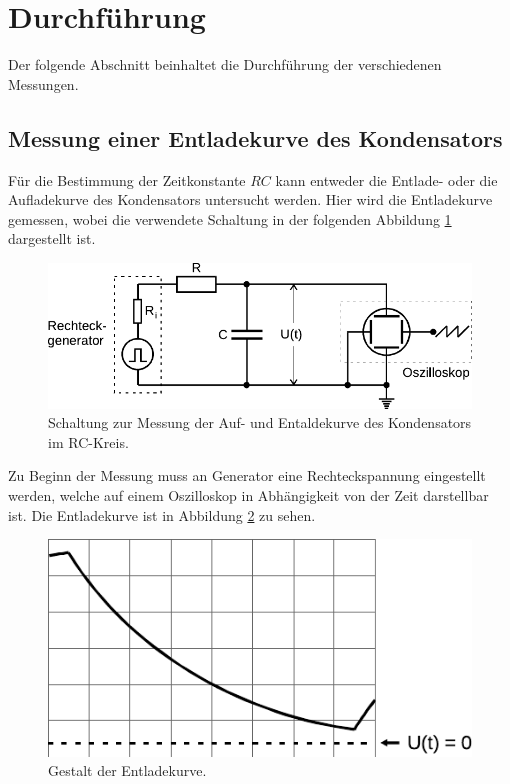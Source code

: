 \section{Durchführung}
\label{sec:durchfuehrung}

    Der folgende Abschnitt beinhaltet die Durchführung der verschiedenen Messungen.

\subsection{Messung einer Entladekurve des Kondensators}

    Für die Bestimmung der Zeitkonstante $RC$ kann entweder die Entlade- oder die Aufladekurve des Kondensators untersucht werden.
    Hier wird die Entladekurve gemessen,
    wobei die verwendete Schaltung in der folgenden Abbildung \ref{fig:messung_entladekurve} dargestellt ist.

    \begin{figure}
        \centering
        \includegraphics{content/img/Abb_3.pdf}
        \caption{Schaltung zur Messung der Auf- und Entaldekurve des Kondensators im RC-Kreis.}
        \label{fig:messung_entladekurve}
    \end{figure}

    Zu Beginn der Messung muss an Generator eine Rechteckspannung eingestellt werden,
    welche auf einem Oszilloskop in Abhängigkeit von der Zeit darstellbar ist.
    Die Entladekurve ist in Abbildung \ref{fig:entladekurve} zu sehen.

    \begin{figure}
        \centering
        \includegraphics{content/img/Abb_4.pdf}
        \caption{Gestalt der Entladekurve.}
        \label{fig:entladekurve}
    \end{figure}

